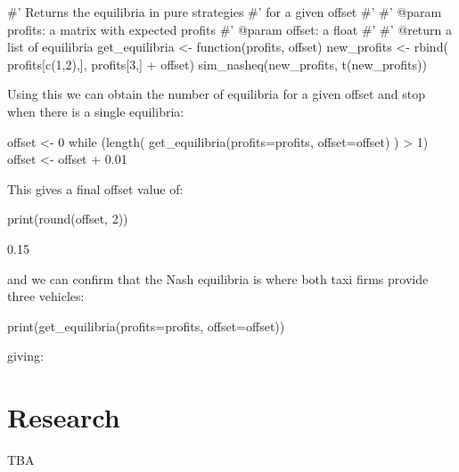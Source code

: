 \begin{Rin}
#' Returns the equilibria in pure strategies 
#' for a given offset
#'
#' @param profits: a matrix with expected profits
#' @param offset: a float
#'
#' @return a list of equilibria
get_equilibria <- function(profits, offset){
    new_profits <- rbind(
                profits[c(1,2),], 
                profits[3,] + offset)
    sim_nasheq(new_profits, t(new_profits))
}
\end{Rin}

Using this we can obtain the number of equilibria for a given offset and stop
when there is a single equilibria:

\begin{Rin}
offset <- 0
while (length(
            get_equilibria(profits=profits, offset=offset)
            ) > 1){
    offset <- offset + 0.01
}
\end{Rin}

This gives a final offset value of:

\begin{Rin}
print(round(offset, 2))
\end{Rin}

\begin{Rout}
[1] 0.15
\end{Rout}

and we can confirm that the Nash equilibria is where both taxi firms provide
three vehicles:

\begin{Rin}
print(get_equilibria(profits=profits, offset=offset))
\end{Rin}

giving:



\section{Research}\label{sec:research}

TBA
